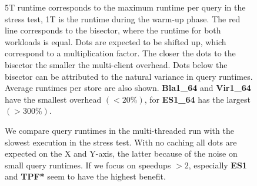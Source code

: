 \documentclass[twocolumn]{bmcart}%
\def\texttt{[image: ]}
\begin{document}
\begin{backmatter}
\begin{figure}[ht!]
	\centering
 	\caption{}
 	\label{fig:Fig06_WatdivTemplateTypes}
\end{figure}
   
\begin{figure}[ht!]
	\centering
	\caption{ 
		5T runtime corresponds to the maximum runtime per query in the stress test, 1T is the runtime during the warm-up phase. The red line corresponds to the bisector, where the runtime for both workloads is equal. Dots are expected to be shifted up, which correspond to a multiplication factor. The closer the dots to the bisector the smaller the multi-client overhead. Dots below the bisector can be attributed to the natural variance in query runtimes. Average runtimes per store are also shown. \textbf{Bla1\_64} and \textbf{Vir1\_64} have the smallest overhead $(< 20\%)$, for \textbf{ES1\_64} has the largest $(> 300\%)$.
	}
	\label{fig:Fig07_Watdiv_SingleMultiClient}
\end{figure}

\begin{figure}[ht!]
	\centering
	\caption{ We compare query runtimes in the multi-threaded run with the slowest execution in the stress test. With no caching all dots are expected on the X and Y-axis, the latter because of the noise on small query runtimes. If we focus on speedups $> 2$, especially \textbf{ES1} and \textbf{TPF*} seem to have the highest benefit.  }
	\label{fig:Fig08_Watdiv_caching}
\end{figure}


\end{backmatter}
\end{document}
